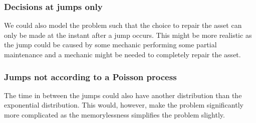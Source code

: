 \subsubsection{Decisions at jumps only}
We could also model the problem such that the choice to repair the asset can only be made at the instant after a jump occurs.
This might be more realistic as the jump could be caused by some mechanic performing some partial maintenance and a mechanic might be needed to completely repair the asset.

\subsubsection{Jumps not according to a Poisson process}
The time in between the jumps could also have another distribution than the exponential distribution.
This would, however, make the problem significantly more complicated as the memorylessness simplifies the problem slightly.